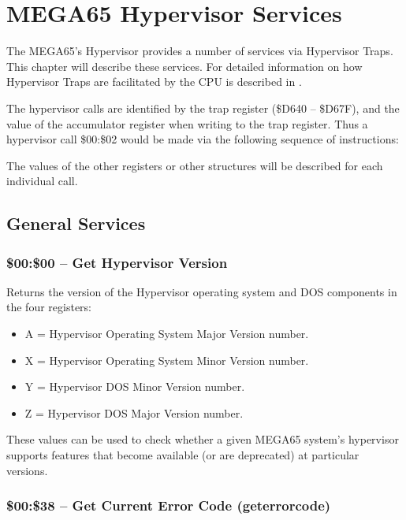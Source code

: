 \chapter{MEGA65 Hypervisor Services}

The MEGA65's Hypervisor provides a number of services via Hypervisor Traps.
This chapter will describe these services.  For detailed information on how
Hypervisor Traps are facilitated by the CPU is described in .

The hypervisor calls are identified by the trap register (\$D640 -- \$D67F), and
the value of the accumulator register when writing to the trap register.  Thus
a hypervisor call \$00:\$02 would be made via the following sequence of instructions:


The values of the other registers or other structures will be described for
each individual call.

\section{General Services}

\subsection{\$00:\$00 -- Get Hypervisor Version}

Returns the version of the Hypervisor operating system and DOS components in the
four registers:

\begin{itemize}
  \item A = Hypervisor Operating System Major Version number. 
  \item X = Hypervisor Operating System Minor Version number. 
  \item Y = Hypervisor DOS Minor Version number. 
  \item Z = Hypervisor DOS Major Version number. 
\end{itemize}

These values can be used to check whether a given MEGA65 system's hypervisor
supports features that become available (or are deprecated) at particular versions.

\subsection{\$00:\$38 -- Get Current Error Code (geterrorcode)}
